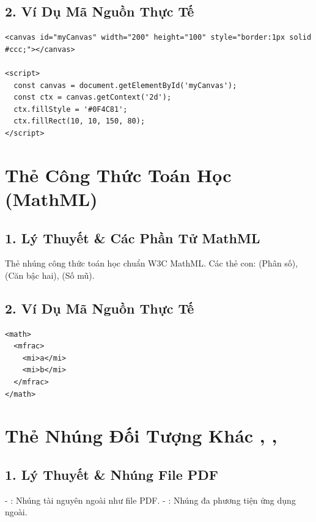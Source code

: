 \subsection{2. Ví Dụ Mã Nguồn Thực Tế}
\begin{lstlisting}[language=HTML5, caption={Ví dụ vẽ hình chữ nhật đỏ bằng Canvas API}]
<canvas id="myCanvas" width="200" height="100" style="border:1px solid #ccc;"></canvas>

<script>
  const canvas = document.getElementById('myCanvas');
  const ctx = canvas.getContext('2d');
  ctx.fillStyle = '#0F4C81';
  ctx.fillRect(10, 10, 150, 80);
</script>
\end{lstlisting}

\section{Thẻ Công Thức Toán Học  (MathML)}
\subsection{1. Lý Thuyết \& Các Phần Tử MathML}
Thẻ  nhúng công thức toán học chuẩn W3C MathML. Các thẻ con:  (Phân số),  (Căn bậc hai),  (Số mũ).

\subsection{2. Ví Dụ Mã Nguồn Thực Tế}
\begin{lstlisting}[language=HTML5, caption={Ví dụ hiển thị công thức toán học Phân số}]
<math>
  <mfrac>
    <mi>a</mi>
    <mi>b</mi>
  </mfrac>
</math>
\end{lstlisting}

\section{Thẻ Nhúng Đối Tượng Khác , , }
\subsection{1. Lý Thuyết \& Nhúng File PDF}
- : Nhúng tài nguyên ngoài như file PDF.
- : Nhúng đa phương tiện ứng dụng ngoài.

